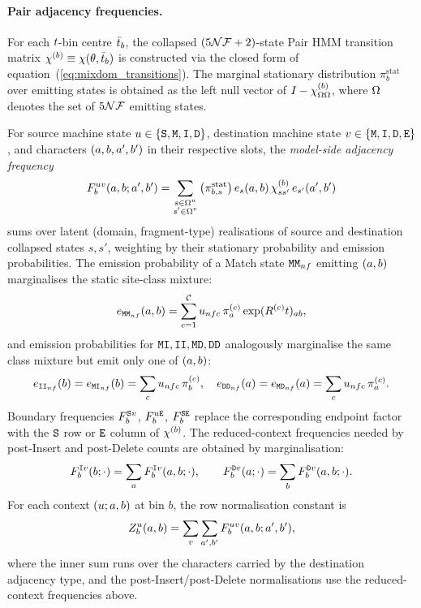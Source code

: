\paragraph{Pair adjacency frequencies.}
For each $t$-bin centre $\bar{t}_b$, the collapsed
$(5\mathcal{N}\mathcal{F}+2)$-state Pair HMM transition matrix
$\chi^{(b)} \equiv \chi(\theta,\bar{t}_b)$
is constructed via the closed form of
equation~(\ref{eq:mixdom_transitions}). The marginal stationary
distribution $\pi^{\text{stat}}_b$ over emitting states is obtained as the
left null vector of $I - \chi^{(b)}_{\Omega\Omega}$, where
$\Omega$ denotes the set of $5\mathcal{N}\mathcal{F}$ emitting states.

For source machine state $u \in \{{\tt S}, {\tt M}, {\tt I}, {\tt D}\}$,
destination machine state $v \in \{{\tt M}, {\tt I}, {\tt D}, {\tt E}\}$,
and characters $(a, b, a', b')$ in their
respective slots, the \emph{model-side adjacency frequency}
\[
F^{uv}_b(a,b;a',b')
=
\sum_{\substack{s \in \Omega^{u} \\ s' \in \Omega^{v}}}
\big(\pi^{\text{stat}}_{b,s}\big)
\,e_s(a,b)
\,\chi^{(b)}_{s s'}
\,e_{s'}(a',b')
\]
sums over latent (domain, fragment-type) realisations of source
and destination collapsed states $s,s'$, weighting by their
stationary probability and emission probabilities.
The emission probability of a Match state ${\tt M}{\tt M}_{nf}$
emitting $(a,b)$ marginalises the static site-class mixture:
\begin{equation}
e_{{\tt M}{\tt M}_{nf}}(a,b)
= \sum_{c=1}^{\mathcal{C}}
u_{nfc}\,
\pi^{(c)}_a
\exp(R^{(c)} t)_{ab},
\label{eq:maraschino-match-emprob}
\end{equation}
and emission probabilities for ${\tt M}{\tt I}, {\tt I}{\tt I}, {\tt M}{\tt D}, {\tt D}{\tt D}$
analogously marginalise the same class mixture but emit only one of
$(a, b)$:
\[
e_{{\tt I}{\tt I}_{nf}}(b)
=e_{{\tt M}{\tt I}_{nf}}(b)
= \sum_c u_{nfc}\,
\pi^{(c)}_b,
\quad
e_{{\tt D}{\tt D}_{nf}}(a)
=e_{{\tt M}{\tt D}_{nf}}(a)
= \sum_c u_{nfc}\,
\pi^{(c)}_a.
\]
Boundary frequencies $F^{{\tt S} v}_b$, $F^{u{\tt E}}_b$,
$F^{{\tt S}{\tt E}}_b$ replace the corresponding endpoint factor with the
${\tt S}$ row or ${\tt E}$ column of $\chi^{(b)}$.
The reduced-context frequencies needed by post-Insert and post-Delete
counts are obtained by marginalisation:
\[
F^{{\tt I} v}_b(b;\cdot) = \sum_{a} F^{{\tt I} v}_b(a,b;\cdot),
\qquad
F^{{\tt D} v}_b(a;\cdot) = \sum_{b} F^{{\tt D} v}_b(a,b;\cdot).
\]
For each context $(u; a,b)$ at bin $b$, the row
normalisation constant is
\[
Z^{u}_b(a,b)
= \sum_{v} \sum_{a',b'} F^{uv}_b(a,b;a',b'),
\]
where the inner sum runs over the characters carried by the destination
adjacency type, and the post-Insert/post-Delete normalisations use the
reduced-context frequencies above.

